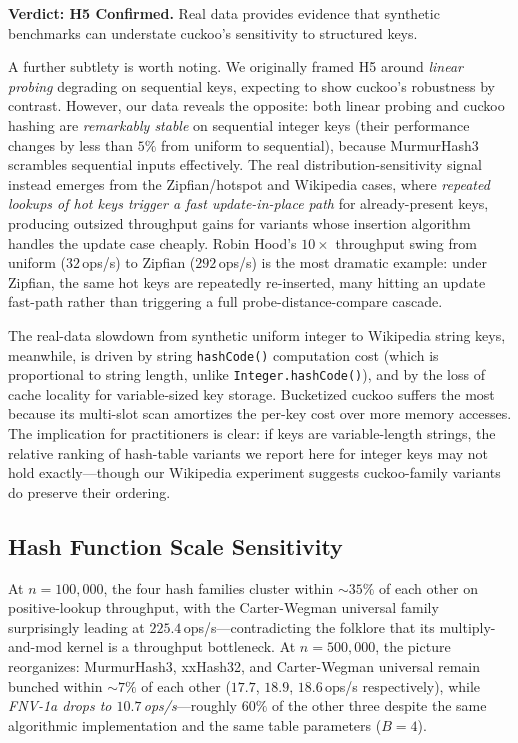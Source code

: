\documentclass[10pt,journal,compsoc]{IEEEtran}
\begin{document}
\textbf{Verdict: H5 Confirmed.} Real data provides evidence that synthetic benchmarks can understate cuckoo's sensitivity to structured keys.

A further subtlety is worth noting. We originally framed H5 around \emph{linear probing} degrading on sequential keys, expecting to show cuckoo's robustness by contrast. However, our data reveals the opposite: both linear probing and cuckoo hashing are \emph{remarkably stable} on sequential integer keys (their performance changes by less than $5\%$ from uniform to sequential), because MurmurHash3 scrambles sequential inputs effectively. The real distribution-sensitivity signal instead emerges from the Zipfian/hotspot and Wikipedia cases, where \emph{repeated lookups of hot keys trigger a fast update-in-place path} for already-present keys, producing outsized throughput gains for variants whose insertion algorithm handles the update case cheaply. Robin Hood's $10\times$ throughput swing from uniform ($32$\,ops/s) to Zipfian ($292$\,ops/s) is the most dramatic example: under Zipfian, the same hot keys are repeatedly re-inserted, many hitting an update fast-path rather than triggering a full probe-distance-compare cascade.

The real-data slowdown from synthetic uniform integer to Wikipedia string keys, meanwhile, is driven by string \texttt{hashCode()} computation cost (which is proportional to string length, unlike \texttt{Integer.hashCode()}), and by the loss of cache locality for variable-sized key storage. Bucketized cuckoo suffers the most because its multi-slot scan amortizes the per-key cost over more memory accesses. The implication for practitioners is clear: if keys are variable-length strings, the relative ranking of hash-table variants we report here for integer keys may not hold exactly---though our Wikipedia experiment suggests cuckoo-family variants do preserve their ordering.

\subsection{Hash Function Scale Sensitivity}

At $n=100{,}000$, the four hash families cluster within $\sim 35\%$ of each other on positive-lookup throughput, with the Carter-Wegman universal family surprisingly leading at $225.4$\,ops/s---contradicting the folklore that its multiply-and-mod kernel is a throughput bottleneck. At $n=500{,}000$, the picture reorganizes: MurmurHash3, xxHash32, and Carter-Wegman universal remain bunched within $\sim 7\%$ of each other ($17.7$, $18.9$, $18.6$\,ops/s respectively), while \emph{FNV-1a drops to $10.7$\,ops/s}---roughly $60\%$ of the other three despite the same algorithmic implementation and the same table parameters ($B=4$).
\end{document}
